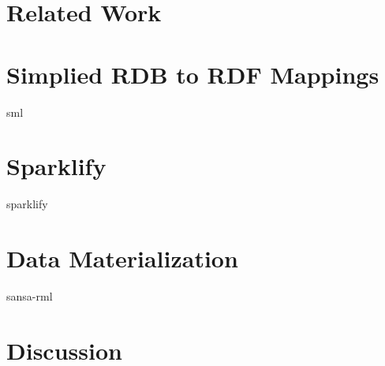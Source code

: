 \section{Related Work}

\section{Simplied RDB to RDF Mappings}
{
\let\section\subsection
\let\subsection\subsubsection
{sml}
}

\section{Sparklify}
{
\let\section\subsection
\let\subsection\subsubsection
{sparklify}
}

\section{Data Materialization}
{
\let\section\subsection
\let\subsection\subsubsection
{sansa-rml}
}

\section{Discussion}

